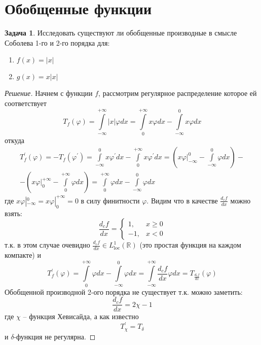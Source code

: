 \documentclass[12pt,a4paper]{article}
\theoremstyle{definition}
\newtheorem{exercise}{Задача}[section]
\newenvironment{solution}
{\renewcommand\qedsymbol{$\blacksquare$}\begin{proof}[Решение]}
{\end{proof}}
\newcommand{\Real}{\mathbb{R}}
\begin{document}
\newpage

\section{Обобщенные функции}

\begin{exercise}
	Исследовать существуют ли обобщенные производные в смысле Соболева 1-го и 2-го порядка для:
	\begin{enumerate}
		\item $f(x) = |x|$
		\item $g(x) = x|x|$
	\end{enumerate}
\end{exercise}
\begin{solution}
	Начнем с функции $f$, рассмотрим регулярное распределение которое ей соответствует
	\begin{equation*}
		T_f (\varphi) = \int\limits_{-\infty}^{+\infty}{|x| \varphi dx} = \int\limits_{0}^{+\infty}{x \varphi dx} - \int\limits_{-\infty}^{0}{x \varphi dx}
	\end{equation*}
	откуда
	\begin{multline*}
		T_f^\prime (\varphi) = -T_f (\varphi^\prime) = \int\limits_{-\infty}^{0}{x \varphi^\prime dx} - \int\limits_{0}^{+\infty}{x \varphi^\prime dx} = \left(x \varphi |_{-\infty}^{0} - \int\limits_{-\infty}^{0}{\varphi dx} \right) - \\ - \left( x \varphi |_{0}^{+\infty} - \int\limits_{0}^{+\infty}{\varphi dx} \right) = \int\limits_{0}^{+\infty}{\varphi dx} - \int\limits_{-\infty}^{0}{\varphi dx}
	\end{multline*}
	где $x \varphi |_{-\infty}^{0} = x \varphi |_{0}^{+\infty} = 0$ в силу финитности $\varphi$. Видим что в качестве $\frac{d_c f}{dx}$ можно взять:
	\begin{equation*}
		\frac{d_c f}{dx} = 
		\begin{cases}
			1, &x \geq 0 \\
			-1, &x < 0
		\end{cases}
	\end{equation*}
	т.к. в этом случае очевидно $\frac{d_c f}{dx} \in L^1_{\text{loc}} (\Real)$ (это простая функция на каждом компакте) и
	\begin{equation*}
		T_f^\prime (\varphi) = \int\limits_{0}^{+\infty}{\varphi dx} - \int\limits_{-\infty}^{0}{\varphi dx} = \int\limits_{-\infty}^{+\infty}{\frac{d_c f}{dx} \varphi dx} = T_{\frac{d_c f}{dx}} (\varphi)
	\end{equation*}
	Обобщенной производной 2-ого порядка не существует т.к. можно заметить:
	\begin{equation*}
		\frac{d_c f}{dx} = 2 \chi - 1
	\end{equation*}
	где $\chi$ -- функция Хевисайда, а как известно
	\begin{equation*}
		T_\chi^\prime = T_\delta
	\end{equation*}
	и $\delta$-функция не регулярна.
	

\end{solution}
\end{document}
